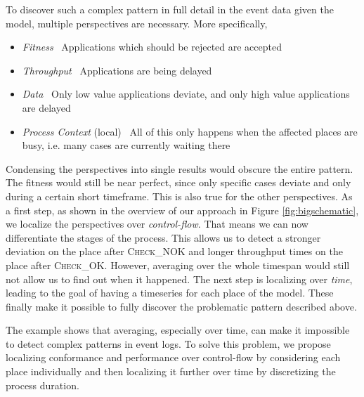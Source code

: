 To discover such a complex pattern in full detail in the event data given the model, multiple perspectives are necessary. More specifically,
\begin{itemize}
    \item \emph{Fitness} \textemdash \ Applications which should be rejected are accepted
    \item \emph{Throughput} \textemdash \ Applications are being delayed
    \item \emph{Data} \textemdash \ Only low value applications deviate, and only high value applications are delayed
    \item \emph{Process Context} (local) \textemdash \ All of this only happens when the affected places are busy, i.e. many cases are currently waiting there
\end{itemize}
Condensing the perspectives into single results would obscure the entire pattern. The fitness would still be near perfect, since only specific cases deviate and only during a certain short timeframe. This is also true for the other perspectives.
As a first step, as shown in the overview of our approach in Figure \ref{fig:bigschematic}, we localize the perspectives over \emph{control-flow}. That means we can now differentiate the stages of the process. This allows us to detect a stronger deviation on the place after \textsc{Check\_NOK} and longer throughput times on the place after \textsc{Check\_OK}.
However, averaging over the whole timespan would still not allow us to find out when it happened.
The next step is localizing over \emph{time}, leading to the goal of having a timeseries for each place of the model. These finally make it possible to fully discover the problematic pattern described above.

The example shows that averaging, especially over time, can make it impossible to detect complex patterns in event logs. To solve this problem, we propose localizing conformance and performance over control-flow by considering each place individually and then localizing it further over time by discretizing the process duration.

